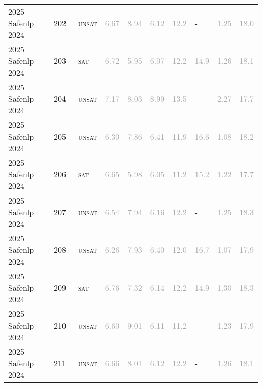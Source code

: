 \begin{center}
{\begin{longtable}{@{}llllllllll@{}}
2025 Safenlp 2024 & 202 & ~\textsc{unsat} & \textcolor{darkgray}{6.67} & \textcolor{darkgray}{8.94} & \textcolor{darkgray}{6.12} & \textcolor{darkgray}{12.2} & - & \textcolor{darkgray}{1.25} & \textcolor{darkgray}{18.0} \\
2025 Safenlp 2024 & 203 & ~\textsc{sat} & \textcolor{darkgray}{6.72} & \textcolor{darkgray}{5.95} & \textcolor{darkgray}{6.07} & \textcolor{darkgray}{12.2} & \textcolor{darkgray}{14.9} & \textcolor{darkgray}{1.26} & \textcolor{darkgray}{18.1} \\
2025 Safenlp 2024 & 204 & ~\textsc{unsat} & \textcolor{darkgray}{7.17} & \textcolor{darkgray}{8.03} & \textcolor{darkgray}{8.99} & \textcolor{darkgray}{13.5} & - & \textcolor{darkgray}{2.27} & \textcolor{darkgray}{17.7} \\
2025 Safenlp 2024 & 205 & ~\textsc{unsat} & \textcolor{darkgray}{6.30} & \textcolor{darkgray}{7.86} & \textcolor{darkgray}{6.41} & \textcolor{darkgray}{11.9} & \textcolor{darkgray}{16.6} & \textcolor{darkgray}{1.08} & \textcolor{darkgray}{18.2} \\
2025 Safenlp 2024 & 206 & ~\textsc{sat} & \textcolor{darkgray}{6.65} & \textcolor{darkgray}{5.98} & \textcolor{darkgray}{6.05} & \textcolor{darkgray}{11.2} & \textcolor{darkgray}{15.2} & \textcolor{darkgray}{1.22} & \textcolor{darkgray}{17.7} \\
2025 Safenlp 2024 & 207 & ~\textsc{unsat} & \textcolor{darkgray}{6.54} & \textcolor{darkgray}{7.94} & \textcolor{darkgray}{6.16} & \textcolor{darkgray}{12.2} & - & \textcolor{darkgray}{1.25} & \textcolor{darkgray}{18.3} \\
2025 Safenlp 2024 & 208 & ~\textsc{unsat} & \textcolor{darkgray}{6.26} & \textcolor{darkgray}{7.93} & \textcolor{darkgray}{6.40} & \textcolor{darkgray}{12.0} & \textcolor{darkgray}{16.7} & \textcolor{darkgray}{1.07} & \textcolor{darkgray}{17.9} \\
2025 Safenlp 2024 & 209 & ~\textsc{sat} & \textcolor{darkgray}{6.76} & \textcolor{darkgray}{7.32} & \textcolor{darkgray}{6.14} & \textcolor{darkgray}{12.2} & \textcolor{darkgray}{14.9} & \textcolor{darkgray}{1.30} & \textcolor{darkgray}{18.3} \\
2025 Safenlp 2024 & 210 & ~\textsc{unsat} & \textcolor{darkgray}{6.60} & \textcolor{darkgray}{9.01} & \textcolor{darkgray}{6.11} & \textcolor{darkgray}{11.2} & - & \textcolor{darkgray}{1.23} & \textcolor{darkgray}{17.9} \\
2025 Safenlp 2024 & 211 & ~\textsc{unsat} & \textcolor{darkgray}{6.66} & \textcolor{darkgray}{8.01} & \textcolor{darkgray}{6.12} & \textcolor{darkgray}{12.2} & - & \textcolor{darkgray}{1.26} & \textcolor{darkgray}{18.1} \\

\end{longtable}}
\end{center}
